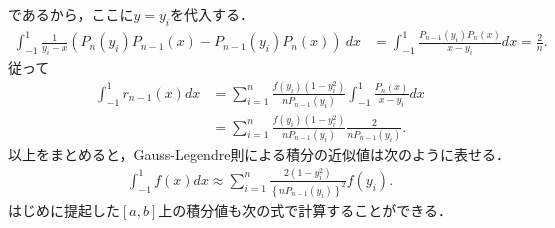 \documentclass[a4j,papersize,disablejfam,slide,14pt]{jsarticle}
\begin{document}
    であるから，ここに$y = y_i$を代入する．
    \begin{align}
    	\int_{-1}^{1} \frac{1}{y_i - x} \left( P_n(y_i) P_{n-1}(x) - P_{n-1} (y_i) P_n(x) \right)\ dx
        &= \int_{-1}^{1} \frac{P_{n-1} (y_i) P_n(x)}{x - y_i} dx = \frac{2}{n}.
    \end{align}
    従って
    \begin{align}
    	\int_{-1}^{1} r_{n-1}(x) dx &= \sum_{i=1}^{n} \frac{f(y_i) (1-y_i^2)}{nP_{n-1}(y_i)} \int_{-1}^{1} \frac{P_n(x)}{x-y_i} dx \\
        &= \sum_{i=1}^{n} \frac{f(y_i) (1-y_i^2)}{nP_{n-1}(y_i)} \frac{2}{n P_{n-1} (y_i)}.
    \end{align}
    以上をまとめると，{\rm Gauss-Legendre}則による積分の近似値は次のように表せる．
    \begin{align}
    	\int_{-1}^{1} f(x) dx \approx \sum_{i=1}^{n} \frac{2(1-y_i^2)}{ \left\{nP_{n-1}(y_i) \right\}^2} f(y_i).
    \end{align}
    はじめに提起した$[a, b]$上の積分値も次の式で計算することができる．
    
\end{document}
